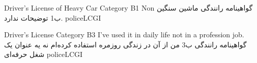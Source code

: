 
\LicensesCertificationsTitleC
{Driver's License of Heavy Car}
{Category B1}
{Non}
{گواهینامه رانندگی ماشین سنگین}
{ب1}
{توضیحات ندارد.}
{}
{}
{policeLCGI}

\LicensesCertificationsTitleC
{Driver's License}
{Category B3}
{I've used it in daily life not in a profession job.}
{گواهینامه رانندگی}
{ب3}
{من از آن در زندگی روزمره استفاده کرده‌ام نه یه عنوان یک شغل حرفه‌ای}
{}
{}
{policeLCGI}
